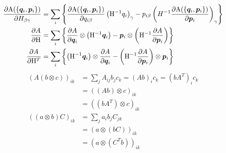 \documentclass[11pt,a4paper,uplatex]{jsarticle}
\begin{document}
\begin{align}
    \frac{\partial {\rm A}(\{\bm{q}_{i}, \bm{p}_{i}\})}{\partial H_{\beta \gamma}} 
    &= \sum_{i} \left\{ \frac{\partial {\rm A}(\{\bm{q}_{i}, \bm{p}_{i}\})}{\partial q_{i \beta}} \left({\rm H}^{-1} q_{i}\right)_{\gamma}
    -  p_{i \beta} \left( H^{-1} \frac{\partial {\rm A}(\{\bm{q}_{i}, \bm{p}_{i}\})}{\partial \bm{p}_{i}}  \right)_{\gamma} \right\} \\
    \frac{\partial A}{\partial {\rm H}} &= \sum_{i} \left\{ 
    \frac{\partial A }{\partial \bm{q}_{i}} \otimes \left({\rm H}^{-1} \bm{q}_{i} \right) 
   - \bm{p}_{i} \otimes \left( {\rm H}^{-1} \frac{\partial A }{\partial \bm{p}_{i}} \right)
    \right\}\\
    \frac{\partial A}{\partial {\rm H}^T} &= \sum_{i} \left\{\left({\rm H}^{-1} \bm{q}_{i} \right)  \otimes \frac{\partial A }{\partial \bm{q}_{i}} 
    - \left( {\rm H}^{-1} \frac{\partial A }{\partial \bm{p}_{i}} \right)\otimes \bm{p}_{i} 
    \right\}
\end{align}
\begin{align}
    \left( A \left(b \otimes c\right) \right)_{ik} &= \sum_{j} A_{ij} b_{j} c_{k}  
    = (Ab)_{i} c_{k} 
    = (b A^{T})_{i} c_{k} \\
    &= \left( (Ab) \otimes c \right)_{ik}\\
    &= \left( (bA^{T}) \otimes c \right)_{ik}\\
    \left( (a \otimes b) C\right)_{ik} &= \sum_{j} a_{i} b_{j} C_{jk} \\
    &= \left( a \otimes \left(b C\right)\right)_{ik} \\
    &= \left( a \otimes \left(C^{T} b \right)\right)_{ik}
\end{align}
\end{document}
